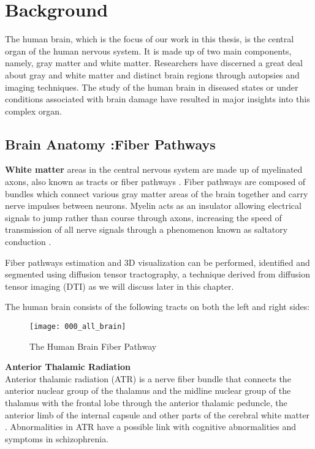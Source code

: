 \documentclass[../structure.tex]{subfiles}
\begin{document}
\chapter{Background}
The human brain, which is the focus of our work in this thesis, is the central organ of the human nervous system. It is made up of two main components, namely, gray matter and white matter. Researchers have discerned a great deal about gray and white matter and distinct brain regions through autopsies and imaging techniques. The study of the human brain in diseased states or under conditions associated with brain damage have resulted in major insights into this complex organ.

\section{Brain Anatomy :Fiber Pathways}
	 \textbf{White matter} areas in the central nervous system are made up of myelinated axons, also known as tracts or fiber pathways \cite{Blumenfeld2010}. Fiber pathways are composed of bundles which connect various gray matter areas of the brain together and carry nerve impulses between neurons. Myelin acts as an insulator allowing electrical signals to jump rather than course through axons, increasing the speed of transmission of all nerve signals through a phenomenon known as saltatory conduction \cite{Klein2008}.
	 
	  Fiber pathways estimation and 3D visualization can be performed, identified and segmented using diffusion tensor tractography, a technique derived from diffusion tensor imaging (DTI) \cite{Seo2013} as we will discuss later in this chapter.
	
	The human brain consists of the following tracts on both the left and right sides:


	\begin{figure}[h!]
	\centering
	\texttt{[image: 000\_all\_brain]}
	\captionsetup{justification=centering}
	\caption{The Human Brain Fiber Pathway}
	\label{fig:all_brain}
	\end{figure}
	
	\textbf{Anterior Thalamic Radiation} \\
	Anterior thalamic radiation (ATR) is a nerve fiber bundle that connects the anterior nuclear group of the thalamus and the midline nuclear group of the thalamus with the frontal lobe through the anterior thalamic peduncle, the anterior limb of the internal capsule and other parts of the cerebral white matter \cite{Washington1994}\cite{Grimm2018}. Abnormalities in ATR have a possible link with cognitive abnormalities and symptoms in schizophrenia\cite{Mamah2010}.	\\
		
\end{document}
